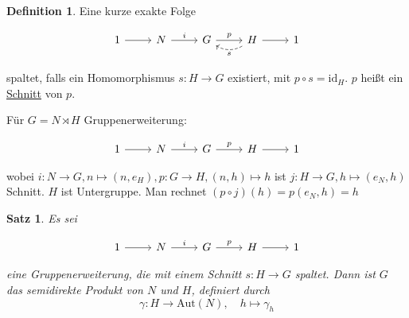 \documentclass[12pt]{scrartcl}%
\newtheorem{thm}{Satz}
\theoremstyle{definition}
\newtheorem*{defn}{Definition}
\theoremstyle{remark}
\begin{document}
\begin{defn}
    Eine kurze exakte Folge 

    \[ \begin{tikzcd}
        1 \arrow[r] & N \arrow[r, "i"] & G \arrow[r, "p"] & H \arrow[l, bend left, dashed, "s"] \arrow[r] & 1
    \end{tikzcd} \]

    spaltet, falls ein Homomorphismus $s: H\to G$ existiert, mit $p\circ s = \text{id}_H$. $p$ heißt ein \underline{Schnitt} von $p$.
\end{defn}

Für $G=N\rtimes H$ Gruppenerweiterung:

\[ \begin{tikzcd}
        1 \arrow[r] & N \arrow[r,"i"] & G \arrow[r,"p"] & H \arrow[r] & 1
\end{tikzcd} \]

wobei $i: N\to G, n\mapsto (n,e_H), p:G\to H, (n,h)\mapsto h$ ist $j:H\to G, h\mapsto (e_N,h)$ Schnitt. $H$ ist Untergruppe. Man rechnet $(p\circ j)(h)=p(e_N,h)=h$

\begin{thm}
    Es sei

    \[ \begin{tikzcd}
        1 \arrow[r] & N \arrow[r,"i"] & G \arrow[r,"p"] & H \arrow[r] & 1
    \end{tikzcd} \]

    eine Gruppenerweiterung, die mit einem Schnitt $s:H\to G$ spaltet. Dann ist $G$ das semidirekte Produkt von $N$ und $H$, definiert durch $$\gamma: H\to \text{Aut}(N), \quad h\mapsto \gamma_h$$
\end{thm}
\end{document}
